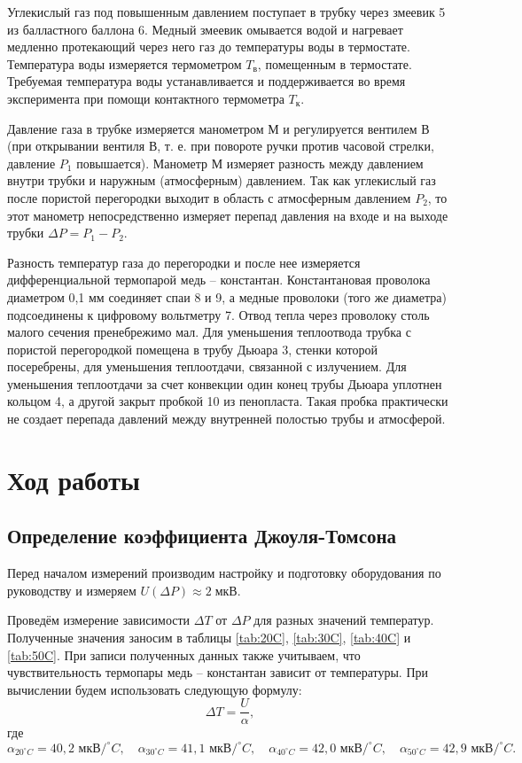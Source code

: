 \documentclass[a4paper,12pt]{article} %
\begin{document}
Углекислый газ под повышенным давлением поступает в трубку через змеевик 5 из балластного баллона 6. Медный змеевик омывается водой и нагревает медленно протекающий через него газ до температуры воды в термостате. Температура воды измеряется термометром $ T_\text{в} $, помещенным в термостате. Требуемая температура воды устанавливается и поддерживается во время эксперимента при помощи контактного термометра $ T_\text{к} $.

Давление газа в трубке измеряется манометром М и регулируется вентилем В (при открывании вентиля В, т. е. при повороте ручки против часовой стрелки, давление $ P_1 $ повышается). Манометр М измеряет разность между давлением внутри трубки и наружным (атмосферным) давлением. Так как углекислый газ после пористой перегородки выходит в область с атмосферным давлением $ P_2 $, то этот манометр непосредственно измеряет перепад давления на входе и на выходе трубки $ \Delta P = P_1 - P_2 $.

Разность температур газа до перегородки и после нее измеряется дифференциальной термопарой медь -- константан. Константановая проволока диаметром 0,1 мм соединяет спаи 8 и 9, а медные проволоки (того же диаметра) подсоединены к цифровому вольтметру 7. Отвод тепла через проволоку столь малого сечения пренебрежимо мал. Для уменьшения теплоотвода трубка с пористой перегородкой помещена в трубу Дьюара 3, стенки которой посеребрены, для уменьшения теплоотдачи, связанной с излучением. Для уменьшения теплоотдачи за счет конвекции один конец трубы Дьюара уплотнен кольцом 4, а другой закрыт пробкой 10 из пенопласта. Такая пробка практически не создает перепада давлений между внутренней полостью трубы и атмосферой.

\section*{Ход работы}

\subsection*{Определение коэффициента Джоуля-Томсона}
Перед началом измерений производим настройку и подготовку оборудования по руководству и измеряем $U(\Delta P) \approx 2\;\text{мкВ}$. 

Проведём измерение зависимости $ \Delta T $ от $ \Delta P $ для разных значений температур. Полученные значения заносим в таблицы \ref{tab:20C}, \ref{tab:30C}, \ref{tab:40C} и \ref{tab:50C}. При записи полученных данных также учитываем, что чувствительность термопары медь -- константан зависит от температуры. При вычислении будем использовать следующую формулу: \[ \Delta T = \frac{U}{\alpha}, \] где \[ \alpha_{20^\circ C} = 40,2 \text{ мкВ}/^\circ C, \quad \alpha_{30^\circ C} = 41,1 \text{ мкВ}/^\circ C, \quad \alpha_{40^\circ C} = 42,0 \text{ мкВ}/^\circ C, \quad \alpha_{50^\circ C} = 42,9 \text{ мкВ}/^\circ C . \]
\end{document}
